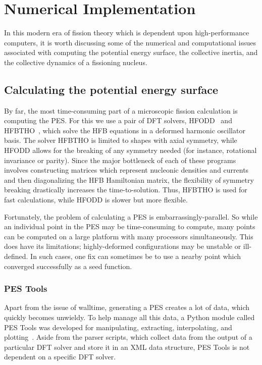 \chapter{Numerical Implementation}\label{chap:Numerical}

In this modern era of fission theory which is dependent upon high-performance computers, it is worth discussing some of the numerical and computational issues associated with computing the potential energy surface, the collective inertia, and the collective dynamics of a fissioning nucleus.

\section{Calculating the potential energy surface}
By far, the most time-consuming part of a microscopic fission calculation is computing the PES. For this we use a pair of DFT solvers, HFODD~\cite{Schunck2017} and HFBTHO~\cite{Perez2017}, which solve the HFB equations in a deformed harmonic oscillator basis. The solver HFBTHO is limited to shapes with axial symmetry, while HFODD allows for the breaking of any symmetry needed (for instance, rotational invariance or parity). Since the major bottleneck of each of these programs involves constructing matrices which represent nucleonic densities and currents and then diagonalizing the HFB Hamiltonian matrix, the flexibility of symmetry breaking drastically increases the time-to-solution. Thus, HFBTHO is used for fast calculations, while HFODD is slower but more flexible.

Fortunately, the problem of calculating a PES is embarrassingly-parallel. So while an individual point in the PES may be time-consuming to compute, many points can be computed on a large platform with many processors simultaneously. This does have its limitations; highly-deformed configurations may be unstable or ill-defined. In such cases, one fix can sometimes be to use a nearby point which converged successfully as a seed function.


\subsection{PES Tools}
Apart from the issue of walltime, generating a PES creates a lot of data, which quickly becomes unwieldy. To help manage all this data, a Python module called PES Tools was developed for manipulating, extracting, interpolating, and plotting~\cite{PES_tools}. Aside from the parser scripts, which collect data from the output of a particular DFT solver and store it in an XML data structure, PES Tools is not dependent on a specific DFT solver.

